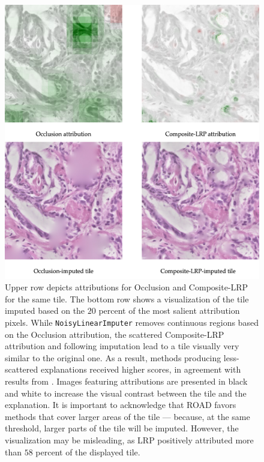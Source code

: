 \begin{figure}
    \begin{center}
    \begin{minipage}{0.8\textwidth}
      \includegraphics[width=\textwidth]{img/road-impute.png}
    \end{minipage}
    \caption{Upper row depicts attributions for Occlusion and Composite-LRP for the same tile. The bottom row shows a visualization of the tile imputed based on the $20$ percent of the most salient attribution pixels. While \texttt{NoisyLinearImputer} removes continuous regions based on the Occlusion attribution, the scattered Composite-LRP attribution and following imputation lead to a tile visually very similar to the original one. As a result, methods producing less-scattered explanations received higher scores, in agreement with results from \cite{gallo}. Images featuring attributions are presented in black and white to increase the visual contrast between the tile and the explanation. It is important to acknowledge that ROAD favors methods that cover larger areas of the tile --- because, at the same threshold, larger parts of the tile will be imputed. However, the visualization may be misleading, as LRP positively attributed more than $58$ percent of the displayed tile.}
    \label{fig:road-impute}
    \end{center}
\end{figure}

